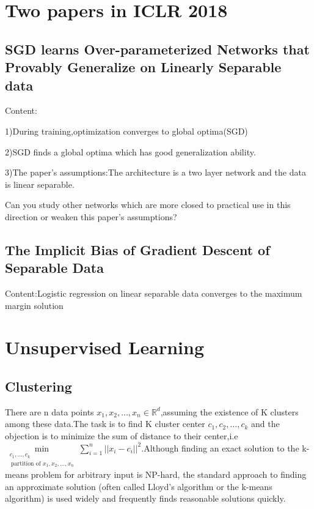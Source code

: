 \documentclass[twoside]{article}
\begin{document}
\section{Two papers in ICLR 2018}
\subsection{SGD learns Over-parameterized Networks that Provably Generalize on Linearly Separable data}

Content:

1)During training,optimization converges to global optima(SGD)


2)SGD finds a global optima which has good generalization ability.

3)The paper's assumptions:The architecture is a two layer network and the data is linear separable.

Can you study other networks which are more closed to practical use in this direction or weaken this paper's assumptions?

\subsection{The Implicit Bias of Gradient Descent of Separable Data}

Content:Logistic regression on linear separable data converges to the maximum margin solution

\section{Unsupervised Learning}
\subsection{Clustering}

There are n data points $x_1,x_2,\dots,x_n \in \mathbb{R}^d$,assuming the existence of  K clusters among these data.The task is to find K cluster center $c_1,c_2,\dots,c_k $ and the  objection is to minimize the sum of distance to their center,i.e $\min\limits_{\substack{c_1,\dots,c_k \\\ \text{partition of } x_1,x_2,\dots ,x_n}}\sum\limits_{i=1}^n||x_i-c_i||^2$.Although finding an exact solution to the k-means problem for arbitrary input is NP-hard, the standard approach to finding an approximate solution (often called Lloyd's algorithm or the k-means algorithm) is used widely and frequently finds reasonable solutions quickly.
\end{document}

